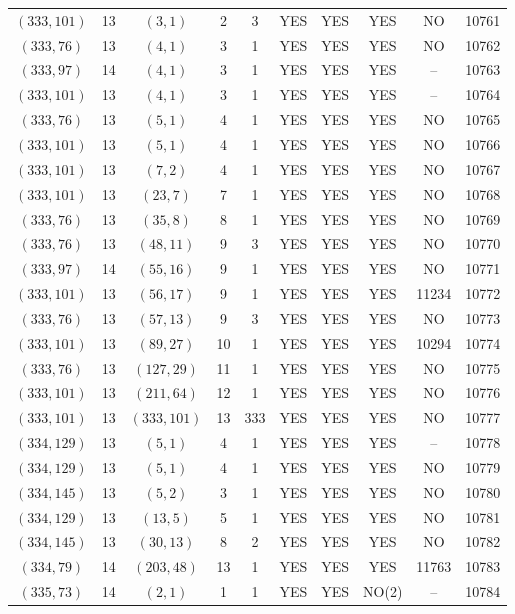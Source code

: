 \begin{longtable}{|c|c|c|c|c|c|c|c|c|c|}
$(333, 101)$ & 13 & $(3, 1)$ & 2 & 3 & YES & YES & YES & NO & 10761\\
$(333, 76)$ & 13 & $(4, 1)$ & 3 & 1 & YES & YES & YES & NO & 10762\\
$(333, 97)$ & 14 & $(4, 1)$ & 3 & 1 & YES & YES & YES & -- & 10763\\
$(333, 101)$ & 13 & $(4, 1)$ & 3 & 1 & YES & YES & YES & -- & 10764\\
$(333, 76)$ & 13 & $(5, 1)$ & 4 & 1 & YES & YES & YES & NO & 10765\\
$(333, 101)$ & 13 & $(5, 1)$ & 4 & 1 & YES & YES & YES & NO & 10766\\
$(333, 101)$ & 13 & $(7, 2)$ & 4 & 1 & YES & YES & YES & NO & 10767\\
$(333, 101)$ & 13 & $(23, 7)$ & 7 & 1 & YES & YES & YES & NO & 10768\\
$(333, 76)$ & 13 & $(35, 8)$ & 8 & 1 & YES & YES & YES & NO & 10769\\
$(333, 76)$ & 13 & $(48, 11)$ & 9 & 3 & YES & YES & YES & NO & 10770\\
$(333, 97)$ & 14 & $(55, 16)$ & 9 & 1 & YES & YES & YES & NO & 10771\\
$(333, 101)$ & 13 & $(56, 17)$ & 9 & 1 & YES & YES & YES & 11234 & 10772\\
$(333, 76)$ & 13 & $(57, 13)$ & 9 & 3 & YES & YES & YES & NO & 10773\\
$(333, 101)$ & 13 & $(89, 27)$ & 10 & 1 & YES & YES & YES & 10294 & 10774\\
$(333, 76)$ & 13 & $(127, 29)$ & 11 & 1 & YES & YES & YES & NO & 10775\\
$(333, 101)$ & 13 & $(211, 64)$ & 12 & 1 & YES & YES & YES & NO & 10776\\
$(333, 101)$ & 13 & $(333, 101)$ & 13 & 333 & YES & YES & YES & NO & 10777\\
$(334, 129)$ & 13 & $(5, 1)$ & 4 & 1 & YES & YES & YES & -- & 10778\\
$(334, 129)$ & 13 & $(5, 1)$ & 4 & 1 & YES & YES & YES & NO & 10779\\
$(334, 145)$ & 13 & $(5, 2)$ & 3 & 1 & YES & YES & YES & NO & 10780\\
$(334, 129)$ & 13 & $(13, 5)$ & 5 & 1 & YES & YES & YES & NO & 10781\\
$(334, 145)$ & 13 & $(30, 13)$ & 8 & 2 & YES & YES & YES & NO & 10782\\
$(334, 79)$ & 14 & $(203, 48)$ & 13 & 1 & YES & YES & YES & 11763 & 10783\\
$(335, 73)$ & 14 & $(2, 1)$ & 1 & 1 & YES & YES & NO(2) & -- & 10784\\

\end{longtable}
